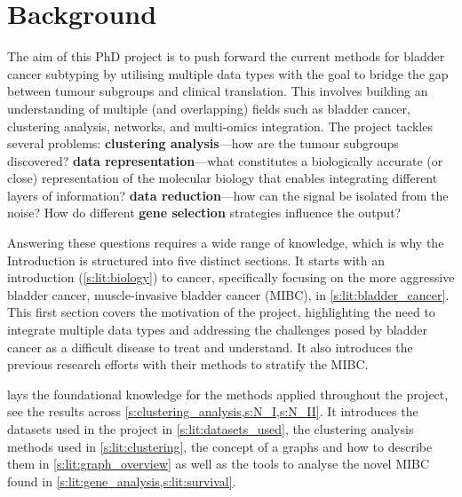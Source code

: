 

\chapter{Background} \label{s:lit_review_intro}


The aim of this PhD project is to push forward the current methods for bladder cancer subtyping by utilising multiple data types with the goal to bridge the gap between tumour subgroups and clinical translation. This involves building an understanding of multiple (and overlapping) fields such as bladder cancer, clustering analysis, networks, and multi-omics integration. The project tackles several problems: \textbf{clustering analysis}—how are the tumour subgroups discovered? \textbf{data representation}—what constitutes a biologically accurate (or close) representation of the molecular biology that enables integrating different layers of information? \textbf{data reduction}—how can the signal be isolated from the noise? How do different \textbf{gene selection} strategies influence the output?

Answering these questions requires a wide range of knowledge, which is why the Introduction is structured into five distinct sections. It starts with an introduction (\cref{s:lit:biology}) to cancer, specifically focusing on the more aggressive bladder cancer, muscle-invasive bladder cancer (MIBC), in \cref{s:lit:bladder_cancer}. This first section covers the motivation of the project, highlighting the need to integrate multiple data types and addressing the challenges posed by bladder cancer as a difficult disease to treat and understand. It also introduces the previous research efforts with their methods to stratify the MIBC.

 lays the foundational knowledge for the methods applied throughout the project, see the results across \cref{s:clustering_analysis,s:N_I,s:N_II}. It introduces the datasets used in the project in \cref{s:lit:datasets_used}, the clustering analysis methods used in \cref{s:lit:clustering}, the concept of a graphs and how to describe them in \cref{s:lit:graph_overview} as well as the tools to analyse the novel MIBC found in \cref{s:lit:gene_analysis,s:lit:survival}. 


